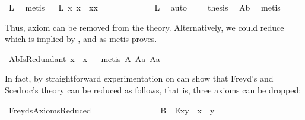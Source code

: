 \begin{isabellebody}
\ L{}{}\ \isamarkupfalse%
\ metis\isanewline
\ \isamarkupfalse%
\ L{}{}{\isacharcolon}\ {\isachardoublequoteopen}{\isasymforall}x{\isachardot}\ {\isacharparenleft}{\isasymbox}x{\isacharparenright}{\isasymbox}\ {\isasymapprox}\ {\isacharparenleft}{\isasymbox}x{\isacharparenright}{\isasymcdot}{\isacharparenleft}{\isacharparenleft}{\isasymbox}x{\isacharparenright}{\isasymbox}{\isacharparenright}{\isachardoublequoteclose}\ \ \ \ \ \ \ \ \ \ \ \ \isamarkupfalse%
\ L{}{}\ \isamarkupfalse%
\ auto\isanewline
\ \isamarkupfalse%
\ \isamarkupfalse%
\ {\isacharquery}thesis\ \isamarkupfalse%
\ A{}b\ \isamarkupfalse%
\ metis\isanewline
{}\isamarkupfalse%
%
\endisatagproof
{\isafoldproof}%
%
\isadelimproof
%
\endisadelimproof
%
\begin{isamarkuptext}%
Thus, axiom  can be removed from the theory. Alternatively, 
we could reduce  which is implied by , 
 and  as metis proves.%
\end{isamarkuptext}%
\isamarkuptrue%
\isamarkupfalse%
\ A{}bIsRedundant{\isacharunderscore}{}{\isacharcolon}\ {\isachardoublequoteopen}{\isasymbox}{\isacharparenleft}x{\isasymbox}{\isacharparenright}\ {\isasymapprox}\ {\isasymbox}x{\isachardoublequoteclose}%
\isadelimproof
\ %
\endisadelimproof
%
\isatagproof
{}\isamarkupfalse%
\ {\isacharparenleft}metis\ A{}\ A{}a\ A{}a{\isacharparenright}%
\endisatagproof
{\isafoldproof}%
%
\isadelimproof
%
\endisadelimproof
%
\begin{isamarkuptext}%
In fact, by straightforward experimentation on can show that Freyd's and Scedroc's theory can be 
reduced as follows, that is, three axioms can be dropped:%
\end{isamarkuptext}%
\isamarkuptrue%
\isamarkupfalse%
\ FreydsAxiomsReduced\ \ \ \ \ \ \ \ \ \ \ \ \ \ \ \isanewline
\ B{}{\isacharcolon}\ \ {\isachardoublequoteopen}\isactrlbold E{\isacharparenleft}x{\isasymcdot}y{\isacharparenright}\ \isactrlbold {\isasymleftrightarrow}\ {\isacharparenleft}{\isacharparenleft}x{\isasymbox}{\isacharparenright}\ {\isasymapprox}\ {\isacharparenleft}{\isasymbox}y{\isacharparenright}{\isacharparenright}{\isachardoublequoteclose}\ \isanewline

\end{isabellebody}

